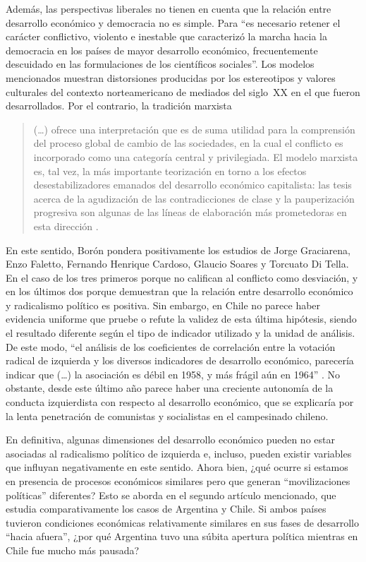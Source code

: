 Además, las perspectivas liberales no tienen en cuenta que la relación entre desarrollo económico y democracia no es simple. Para \textcite[252]{1572-BORON1970} \enquote{es necesario retener el carácter conflictivo, violento e inestable que caracterizó la marcha hacia la democracia en los países de mayor desarrollo económico, frecuentemente descuidado en las formulaciones de los científicos sociales}. Los modelos mencionados muestran distorsiones producidas por los estereotipos y valores culturales del contexto norteamericano de mediados del siglo~XX en el que fueron desarrollados. Por el contrario, la tradición marxista

\begin{quote}
(\dots) ofrece una interpretación que es de suma utilidad para la comprensión del proceso global de cambio de las sociedades, en la cual el conflicto es incorporado como una categoría central y privilegiada. El modelo marxista es, tal vez, la más importante teorización en torno a los efectos desestabilizadores emanados del desarrollo económico capitalista: las tesis acerca de la agudización de las contradicciones de clase y la pauperización progresiva son algunas de las líneas de elaboración más prometedoras en esta dirección \parencite[254]{1572-BORON1970}.
\end{quote}

En este sentido, Borón pondera positivamente los estudios de Jorge Graciarena, Enzo Faletto, Fernando Henrique Cardoso, Glaucio Soares y Torcuato Di Tella. En el caso de los tres primeros porque no califican al conflicto como desviación, y en los últimos dos porque demuestran que la relación entre desarrollo económico y radicalismo político es positiva. Sin embargo, en Chile no parece haber evidencia uniforme que pruebe o refute la validez de esta última hipótesis, siendo el resultado diferente según el tipo de indicador utilizado y la unidad de análisis. De este modo, \enquote{el análisis de los coeficientes de correlación entre la votación radical de izquierda y los diversos indicadores de desarrollo económico, parecería indicar que (\dots) la asociación es débil en 1958, y más frágil aún en 1964} \parencite[283]{1572-BORON1970}. No obstante, desde este último año parece haber una creciente autonomía de la conducta izquierdista con respecto al desarrollo económico, que se explicaría por la lenta penetración de comunistas y socialistas en el campesinado chileno.

En definitiva, algunas dimensiones del desarrollo económico pueden no estar asociadas al radicalismo político de izquierda e, incluso, pueden existir variables que influyan negativamente en este sentido. Ahora bien, ¿qué ocurre si estamos en presencia de procesos económicos similares pero que generan \enquote{movilizaciones políticas} diferentes? Esto se aborda en el segundo artículo mencionado, que estudia comparativamente los casos de Argentina y Chile. Si ambos países tuvieron condiciones económicas relativamente similares en sus fases de desarrollo \enquote{hacia afuera}, ¿por qué Argentina tuvo una súbita apertura política mientras en Chile fue mucho más pausada?

